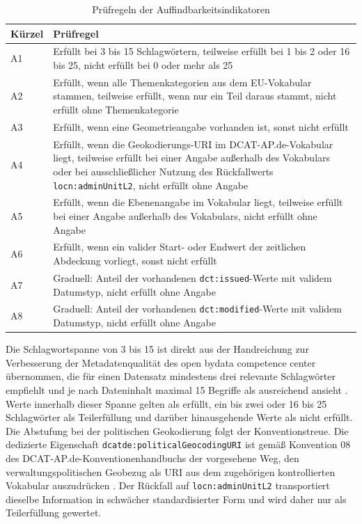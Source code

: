 \begin{table}[H]
\centering
\scriptsize
\renewcommand{\arraystretch}{1.2}
\begin{tabular}{p{} >{\raggedright\arraybackslash}p{}}
\hline
\textbf{Kürzel} & \textbf{Prüfregel} \\
\hline
A1 & Erfüllt bei 3 bis 15 Schlagwörtern, teilweise erfüllt bei 1 bis 2 oder 16 bis 25, nicht erfüllt bei 0 oder mehr als 25 \\
\hline
A2 & Erfüllt, wenn alle Themenkategorien aus dem EU-Vokabular stammen, teilweise erfüllt, wenn nur ein Teil daraus stammt, nicht erfüllt ohne Themenkategorie \\
\hline
A3 & Erfüllt, wenn eine Geometrieangabe vorhanden ist, sonst nicht erfüllt \\
\hline
A4 & Erfüllt, wenn die Geokodierungs-URI im DCAT-AP.de-Vokabular liegt, teilweise erfüllt bei einer Angabe außerhalb des Vokabulars oder bei ausschließlicher Nutzung des Rückfallwerts \texttt{locn:adminUnitL2}, nicht erfüllt ohne Angabe \\
\hline
A5 & Erfüllt, wenn die Ebenenangabe im Vokabular liegt, teilweise erfüllt bei einer Angabe außerhalb des Vokabulars, nicht erfüllt ohne Angabe \\
\hline
A6 & Erfüllt, wenn ein valider Start- oder Endwert der zeitlichen Abdeckung vorliegt, sonst nicht erfüllt \\
\hline
A7 & Graduell: Anteil der vorhandenen \texttt{dct:issued}-Werte mit validem Datumstyp, nicht erfüllt ohne Angabe \\
\hline
A8 & Graduell: Anteil der vorhandenen \texttt{dct:modified}-Werte mit validem Datumstyp, nicht erfüllt ohne Angabe \\
\hline
\end{tabular}
\caption{Prüfregeln der Auffindbarkeitsindikatoren}
\label{tab:impl_findability}
\end{table}

Die Schlagwortspanne von 3 bis 15 ist direkt aus der Handreichung zur Verbesserung der Metadatenqualität des open bydata competence center übernommen, die für einen Datensatz mindestens drei relevante Schlagwörter empfiehlt und je nach Dateninhalt maximal 15 Begriffe als ausreichend ansieht \cite{bydata2025handreichung}. Werte innerhalb dieser Spanne gelten als erfüllt, ein bis zwei oder 16 bis 25 Schlagwörter als Teilerfüllung und darüber hinausgehende Werte als nicht erfüllt. Die Abstufung bei der politischen Geokodierung folgt der Konventionstreue. Die dedizierte Eigenschaft \texttt{dcatde:politicalGeocodingURI} ist gemäß Konvention 08 des DCAT-AP.de-Konventionenhandbuchs der vorgesehene Weg, den verwaltungspolitischen Geobezug als URI aus dem zugehörigen kontrollierten Vokabular auszudrücken \cite{DCATAPDEImplRules2}. Der Rückfall auf \texttt{locn:adminUnitL2} transportiert dieselbe Information in schwächer standardisierter Form und wird daher nur als Teilerfüllung gewertet.

